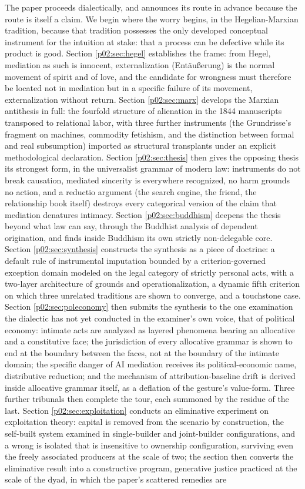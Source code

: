 \documentclass[11pt,a4paper]{article}
\begin{document}
The paper proceeds dialectically, and announces its route in advance because the route is itself a claim. We begin where the worry begins, in the Hegelian-Marxian tradition, because that tradition possesses the only developed conceptual instrument for the intuition at stake: that a process can be defective while its product is good. Section \ref{p02:sec:hegel} establishes the frame: from Hegel, mediation as such is innocent, externalization (Ent\"au{\ss}erung) is the normal movement of spirit and of love, and the candidate for wrongness must therefore be located not in mediation but in a specific failure of its movement, externalization without return. Section \ref{p02:sec:marx} develops the Marxian antithesis in full: the fourfold structure of alienation in the 1844 manuscripts transposed to relational labor, with three further instruments (the Grundrisse's fragment on machines, commodity fetishism, and the distinction between formal and real subsumption) imported as structural transplants under an explicit methodological declaration. Section \ref{p02:sec:thesis} then gives the opposing thesis its strongest form, in the universalist grammar of modern law: instruments do not break causation, mediated sincerity is everywhere recognized, no harm grounds no action, and a reductio argument (the search engine, the friend, the relationship book itself) destroys every categorical version of the claim that mediation denatures intimacy. Section \ref{p02:sec:buddhism} deepens the thesis beyond what law can say, through the Buddhist analysis of dependent origination, and finds inside Buddhism its own strictly non-delegable core. Section \ref{p02:sec:synthesis} constructs the synthesis as a piece of doctrine: a default rule of instrumental imputation bounded by a criterion-governed exception domain modeled on the legal category of strictly personal acts, with a two-layer architecture of grounds and operationalization, a dynamic fifth criterion on which three unrelated traditions are shown to converge, and a touchstone case. Section \ref{p02:sec:poleconomy} then submits the synthesis to the one examination the dialectic has not yet conducted in the examiner's own voice, that of political economy: intimate acts are analyzed as layered phenomena bearing an allocative and a constitutive face; the jurisdiction of every allocative grammar is shown to end at the boundary between the faces, not at the boundary of the intimate domain; the specific danger of AI mediation receives its political-economic name, distributive reduction; and the mechanism of attribution-baseline drift is derived inside allocative grammar itself, as a deflation of the gesture's value-form. Three further tribunals then complete the tour, each summoned by the residue of the last. Section \ref{p02:sec:exploitation} conducts an eliminative experiment on exploitation theory: capital is removed from the scenario by construction, the self-built system examined in single-builder and joint-builder configurations, and a wrong is isolated that is insensitive to ownership configuration, surviving even the freely associated producers at the scale of two; the section then converts the eliminative result into a constructive program, generative justice practiced at the scale of the dyad, in which the paper's scattered remedies are 
\end{document}
